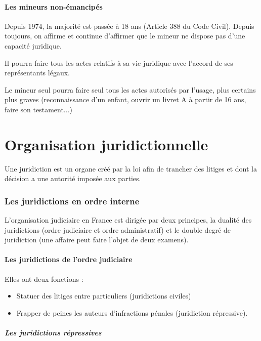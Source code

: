 \documentclass[10pt,a4paper]{article}
\begin{document}
\subsection{Les mineurs non-émancipés}

Depuis 1974, la majorité est passée à 18 ans (Article 388 du Code Civil). Depuis toujours, on affirme et continue d'affirmer que le mineur ne dispose pas d'une capacité juridique.

Il pourra faire tous les actes relatifs à sa vie juridique avec l'accord de ses représentants légaux.

Le mineur seul pourra faire seul tous les actes autorisés par l'usage, plus certains plus graves (reconnaissance d'un enfant, ouvrir un livret A à partir de 16 ans, faire son testament...)

\part{Organisation juridictionnelle}

Une juridiction est un organe créé par la loi afin de trancher des litiges et dont la décision a une autorité imposée aux parties.

\section{Les juridictions en ordre interne}

L'organisation judiciaire en France est dirigée par deux principes, la dualité des juridictions (ordre judiciaire et ordre administratif) et le double degré de juridiction (une affaire peut faire l'objet de deux examens).

\subsection{Les juridictions de l'ordre judiciaire}

Elles ont deux fonctions :
\begin{itemize}
\item Statuer des litiges entre particuliers (juridictions civiles)
\item Frapper de peines les auteurs d'infractions pénales (juridiction répressive).
\end{itemize}

\subsubsection{Les juridictions répressives}
\end{document}
